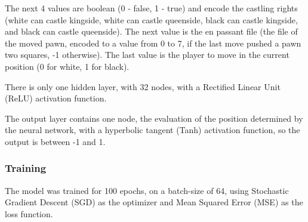 The next 4 values are boolean (0 - false, 1 - true) and encode the castling rights (white can castle kingside, white can castle queenside, black can castle kingside, and black can castle queenside). The next value is the en passant file (the file of the moved pawn, encoded to a value from 0 to 7, if the last move pushed a pawn two squares, -1 otherwise). The last value is the player to move in the current position (0 for white, 1 for black).

There is only one hidden layer, with 32 nodes, with a Rectified Linear Unit (ReLU) activation function.

The output layer contains one node, the evaluation of the position determined by the neural network, with a hyperbolic tangent (Tanh) activation function, so the output is between -1 and 1.

\subsubsection{Training}
\label{subsec:ch4sec3subsec2subsubsec3}


The model was trained for 100 epochs, on a batch-size of 64, using Stochastic Gradient Descent (SGD) as the optimizer and Mean Squared Error (MSE) as the loss function.